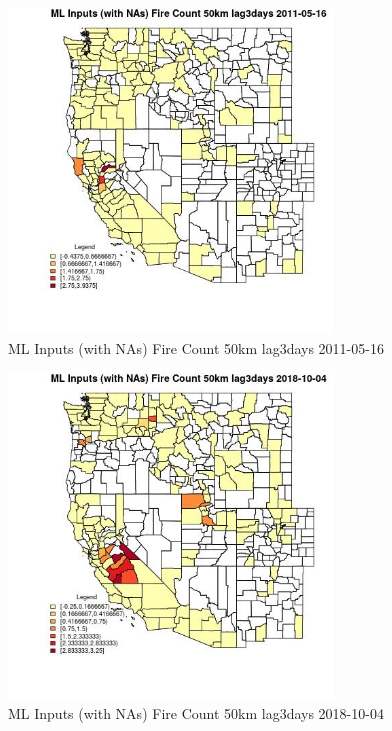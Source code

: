 \begin{figure} 
\centering  
\includegraphics[width=0.77\textwidth]{Code_Outputs/Report_ML_input_PM25_Step4_part_f_de_duplicated_aves_prioritize_24hr_obswNAs_CountyFire_Count_50km_lag3daysMean2011-05-16.jpg} 
\caption{\label{fig:Report_ML_input_PM25_Step4_part_f_de_duplicated_aves_prioritize_24hr_obswNAsCountyFire_Count_50km_lag3daysMean2011-05-16}ML Inputs (with NAs) Fire Count 50km lag3days 2011-05-16} 
\end{figure} 
 

\begin{figure} 
\centering  
\includegraphics[width=0.77\textwidth]{Code_Outputs/Report_ML_input_PM25_Step4_part_f_de_duplicated_aves_prioritize_24hr_obswNAs_CountyFire_Count_50km_lag3daysMean2018-10-04.jpg} 
\caption{\label{fig:Report_ML_input_PM25_Step4_part_f_de_duplicated_aves_prioritize_24hr_obswNAsCountyFire_Count_50km_lag3daysMean2018-10-04}ML Inputs (with NAs) Fire Count 50km lag3days 2018-10-04} 
\end{figure} 
 


